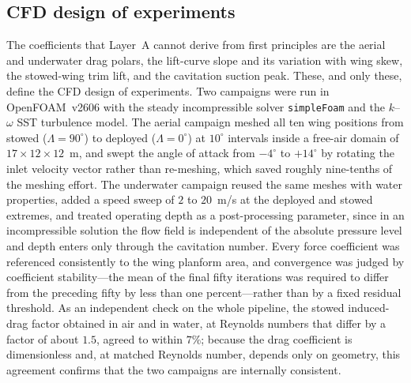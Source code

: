 \documentclass[conf]{new-aiaa}
\begin{document}
\subsection{CFD design of experiments}\label{sec:cfd}
The coefficients that Layer~A cannot derive from first principles are the aerial and underwater drag
polars, the lift-curve slope and its variation with wing skew, the stowed-wing trim lift, and the
cavitation suction peak. These, and only these, define the CFD design of experiments. Two campaigns
were run in OpenFOAM~v2606 with the steady incompressible solver \texttt{simpleFoam} and the
$k$--$\omega$ SST turbulence model. The aerial campaign meshed all ten wing positions from stowed
($\Lambda=90^\circ$) to deployed ($\Lambda=0^\circ$) at $10^\circ$ intervals inside a free-air domain
of $17\times12\times12$~m, and swept the angle of attack from $-4^\circ$ to $+14^\circ$ by rotating
the inlet velocity vector rather than re-meshing, which saved roughly nine-tenths of the meshing
effort. The underwater campaign reused the same meshes with water properties, added a speed sweep of
$2$ to $20$~m/s at the deployed and stowed extremes, and treated operating depth as a
post-processing parameter, since in an incompressible solution the flow field is independent of the
absolute pressure level and depth enters only through the cavitation number. Every force coefficient
was referenced consistently to the wing planform area, and convergence was judged by coefficient
stability---the mean of the final fifty iterations was required to differ from the preceding fifty by
less than one percent---rather than by a fixed residual threshold. As an independent check on the
whole pipeline, the stowed induced-drag factor obtained in air and in water, at Reynolds numbers that
differ by a factor of about $1.5$, agreed to within $7\%$; because the drag coefficient is
dimensionless and, at matched Reynolds number, depends only on geometry, this agreement confirms that
the two campaigns are internally consistent.
\end{document}
